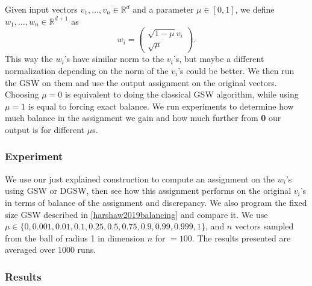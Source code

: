 \documentclass[12pt]{article}
\begin{document}
Given input vectors $v_1,\dots,v_n\in\mathbb{R}^d$ and a parameter $\mu\in[0,1]$, we define $w_1,\dots,w_n\in\mathbb{R}^{d+1}$ as $$w_i=\begin{pmatrix}\sqrt{1-\mu}v_i \\ \sqrt{\mu}\end{pmatrix}.$$ This way the $w_i$'s have similar norm to the $v_i$'s, but maybe a different normalization depending on the norm of the $v_i$'s could be better. We then run the GSW on them and use the output assignment on the original vectors. Choosing $\mu=0$ is equivalent to doing the classical GSW algorithm, while using $\mu=1$ is equal to forcing exact balance. We run experiments to determine how much balance in the assignment we gain and how much further from \textbf{0} our output is for different $\mu$s.

\subsubsection{Experiment}
We use our just explained construction to compute an assignment on the $w_i$'s using GSW or DGSW, then see how this assignment performs on the original $v_i$'s in terms of balance of the assignment and discrepancy. We also program the fixed size GSW described in \ref{harshaw2019balancing} and compare it. We use $\mu\in\{0,0.001,0.01,0.1,0.25,0.5,0.75,0.9,0.99,0.999,1\}$, and $n$ vectors sampled from the ball of radius 1 in dimension $n$ for $=100$. The results presented are averaged over 1000 runs.

\subsubsection{Results}
\end{document}
